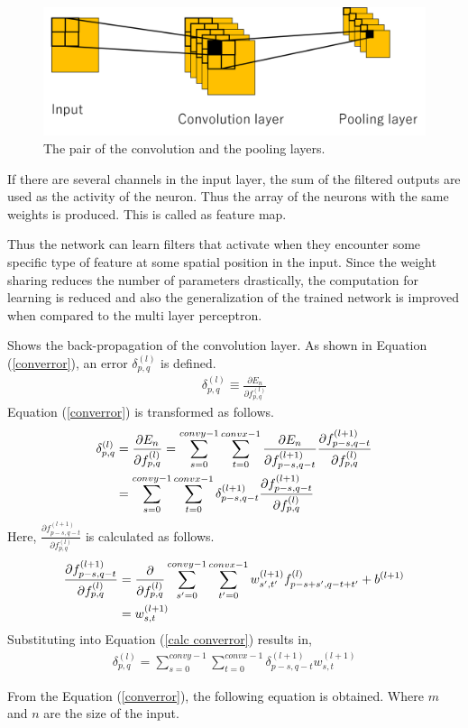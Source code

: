 \documentclass[a4paper,12pt]{article}
\begin{document}
\begin{figure}[ht]
\begin{center}
\includegraphics[scale=0.4]{figure12.png}
\caption{The pair of the convolution and the pooling layers.}
\end{center}
\end{figure}
If there are several channels in the input layer, the sum of the filtered outputs are used as the activity of the neuron. Thus the array of the neurons with the same weights is produced. This is called as feature map. \par
Thus the network can learn filters that activate when they encounter some specific type of feature at some spatial position in the input. Since the weight sharing reduces the number of parameters drastically, the computation for learning is reduced and also the generalization of the trained network is improved when compared to the multi layer perceptron. \par
Shows the back-propagation of the convolution layer. As shown in Equation (\ref{converror}), an error $\delta_{p,q}^{(l)}$ is defined.
\begin{align} \label{converror}
\delta^{(l)}_{p,q} \equiv \frac{\partial E_n}{\partial f_{p,q}^{(l)}}
\end{align}
Equation (\ref{converror}) is transformed as follows.
\begin{align} \label{calc converror}
\delta^{(l)}_{p,q}&=\frac{\partial E_n}{\partial f_{p,q}^{(l)}}=\sum_{s=0}^{convy-1}\sum_{t=0}^{convx-1}{\frac{\partial E_n}{\partial f^{(l+1)}_{p-s,q-t}}\frac{\partial f^{(l+1)}_{p-s,q-t}}{\partial f^{(l)}_{p,q}}} \notag \\
&=\sum_{s=0}^{convy-1}\sum_{t=0}^{convx-1}{\delta^{(l+1)}_{p-s,q-t}\frac{\partial f^{(l+1)}_{p-s,q-t}}{\partial f^{(l)}_{p,q}}}
\end{align}
Here, $\frac{\partial f^{(l+1)}_{p-s,q-t}}{\partial f^{(l)}_{p,q}}$ is calculated as follows.
\begin{align}
\frac{\partial f^{(l+1)}_{p-s,q-t}}{\partial f^{(l)}_{p,q}}&=\frac{\partial}{\partial f^{(l)}_{p,q}}\sum^{convy-1}_{s^{\prime}=0}\sum^{convx-1}_{t^{\prime}=0}{w^{(l+1)}_{s^\prime,t^\prime}f^{(l)}_{p-s+s^\prime, q-t+t^\prime}+b^{(l+1)}} \notag \\
&=w^{(l+1)}_{s,t}
\end{align}
Substituting into Equation (\ref{calc converror}) results in,
\begin{align}
\delta^{(l)}_{p,q} = \sum_{s=0}^{convy-1}\sum_{t=0}^{convx-1}{\delta^{(l+1)}_{p-s,q-t}w^{(l+1)}_{s,t}}
\end{align} \par
From the Equation (\ref{converror}), the following equation is obtained. Where $m$ and $n$ are the size of the input.
\end{document}
